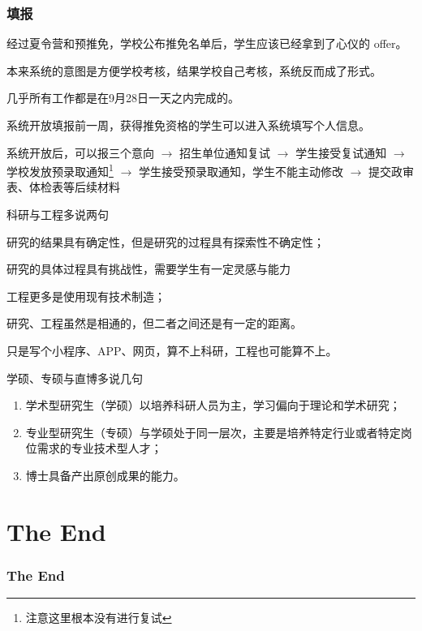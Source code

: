 \begin{frame}
	\frametitle{填报}

	经过夏令营和预推免，学校公布推免名单后，学生应该已经拿到了心仪的 offer。

	本来系统的意图是方便学校考核，结果学校自己考核，系统反而成了形式。

	几乎所有工作都是在9月28日一天之内完成的。

	系统开放填报前一周，获得推免资格的学生可以进入系统填写个人信息。

	系统开放后，可以报三个意向 $\rightarrow$ 招生单位通知复试 $\rightarrow$ 学生接受复试通知 $\rightarrow$ 学校发放预录取通知\footnote{注意这里根本没有进行复试} $\rightarrow$ 学生接受预录取通知，学生不能主动修改 $\rightarrow$ 提交政审表、体检表等后续材料

\end{frame}



\begin{frame}{科研与工程}{多说两句}

	研究的结果具有确定性，但是研究的过程具有探索性不确定性；

	研究的具体过程具有挑战性，需要学生有一定灵感与能力

	工程更多是使用现有技术制造；

	研究、工程虽然是相通的，但二者之间还是有一定的距离。

	只是写个小程序、APP、网页，算不上科研，工程也可能算不上。
\end{frame}

\begin{frame}{学硕、专硕与直博}{多说几句}
	\begin{enumerate}
		\item 学术型研究生（学硕）以培养科研人员为主，学习偏向于理论和学术研究；
		\item 专业型研究生（专硕）与学硕处于同一层次，主要是培养特定行业或者特定岗位需求的专业技术型人才；
		\item 博士具备产出原创成果的能力。
	\end{enumerate}
\end{frame}

\section{The End}
\begin{frame}
	\frametitle{The End}

\end{frame}

